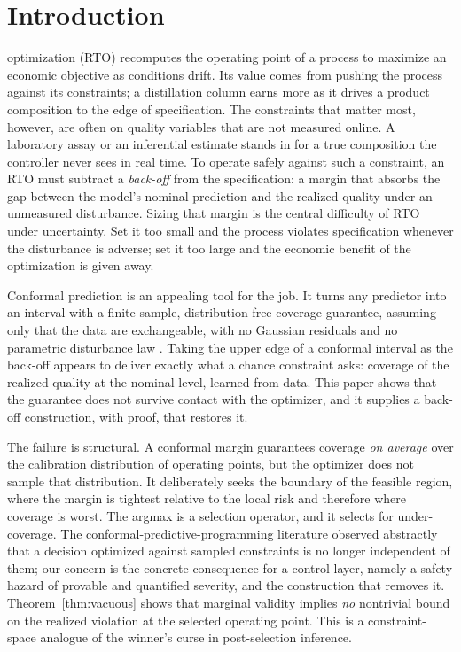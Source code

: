 \documentclass[journal]{IEEEtran}
\begin{document}
\IEEEpeerreviewmaketitle

\section{Introduction}
\label{sec:intro}

 optimization (RTO) recomputes the operating point of a process to
maximize an economic objective as conditions drift. Its value comes from pushing the process
against its constraints; a distillation column earns more as it drives a product composition to
the edge of specification. The constraints that matter most, however, are often on quality
variables that are not measured online. A laboratory assay or an inferential estimate stands in
for a true composition the controller never sees in real time. To operate safely against such a
constraint, an RTO must subtract a \emph{back-off} from the specification: a margin that absorbs
the gap between the model's nominal prediction and the realized quality under an unmeasured
disturbance. Sizing that margin is the central difficulty of RTO under uncertainty. Set it too
small and the process violates specification whenever the disturbance is adverse; set it too
large and the economic benefit of the optimization is given away.

Conformal prediction is an appealing tool for the job. It turns any predictor into an interval
with a finite-sample, distribution-free coverage guarantee, assuming only that the data are
exchangeable, with no Gaussian residuals and no parametric disturbance law
\cite{vovk2005,lei2018,angelopoulos2023}. Taking the upper edge of a conformal interval as the
back-off appears to deliver exactly what a chance constraint asks: coverage of the realized
quality at the nominal level, learned from data. This paper shows that the guarantee does not
survive contact with the optimizer, and it supplies a back-off construction, with proof, that
restores it.

The failure is structural. A conformal margin guarantees coverage \emph{on average} over the
calibration distribution of operating points, but the optimizer does not sample that
distribution. It deliberately seeks the boundary of the feasible region, where the margin is
tightest relative to the local risk and therefore where coverage is worst. The argmax is a
selection operator, and it selects for under-coverage. The conformal-predictive-programming
literature \cite{zhao2024cpp} observed abstractly that a decision optimized against sampled
constraints is no longer independent of them; our concern is the concrete consequence for a
control layer, namely a safety hazard of provable and quantified severity, and the construction
that removes it. Theorem~\ref{thm:vacuous} shows that marginal validity implies \emph{no}
nontrivial bound on the realized violation at the selected operating point. This is a
constraint-space analogue of the winner's curse in post-selection inference.
\end{document}
